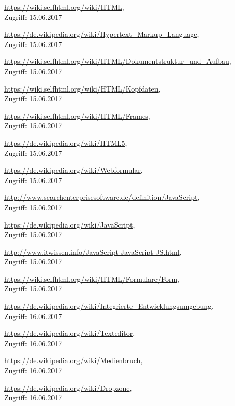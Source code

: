 \documentclass[12pt,a4paper,bibliography=totocnumbered,listof=totocnumbered]{scrartcl}
\begin{document}
\begin{thebibliography}{999}


\url{https://wiki.selfhtml.org/wiki/HTML}, \\
Zugriff: 15.06.2017

\url{https://de.wikipedia.org/wiki/Hypertext\_Markup\_Language},\\
Zugriff: 15.06.2017

\url{https://wiki.selfhtml.org/wiki/HTML/Dokumentstruktur\_und\_Aufbau}, \\
Zugriff: 15.06.2017

\url{https://wiki.selfhtml.org/wiki/HTML/Kopfdaten}, \\
Zugriff: 15.06.2017

\url{https://wiki.selfhtml.org/wiki/HTML/Frames}, \\
Zugriff: 15.06.2017

\url{https://de.wikipedia.org/wiki/HTML5}, \\
Zugriff: 15.06.2017

\url{https://de.wikipedia.org/wiki/Webformular}, \\
Zugriff: 15.06.2017

\url{http://www.searchenterprisesoftware.de/definition/JavaScript}, \\
Zugriff: 15.06.2017

\url{https://de.wikipedia.org/wiki/JavaScript}, \\
Zugriff: 15.06.2017

\url{http://www.itwissen.info/JavaScript-JavaScript-JS.html}, \\
Zugriff: 15.06.2017

\url{https://wiki.selfhtml.org/wiki/HTML/Formulare/Form}, \\
Zugriff: 15.06.2017

\url{https://de.wikipedia.org/wiki/Integrierte_Entwicklungsumgebung}, \\
Zugriff: 16.06.2017

\url{https://de.wikipedia.org/wiki/Texteditor}, \\
Zugriff: 16.06.2017

\url{https://de.wikipedia.org/wiki/Medienbruch}, \\
Zugriff: 16.06.2017

\url{https://de.wikipedia.org/wiki/Dropzone}, \\
Zugriff: 16.06.2017





\end{thebibliography}
\end{document}
